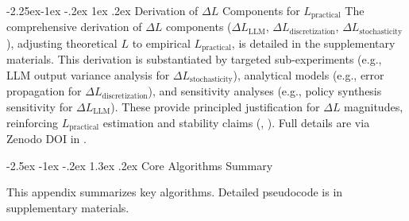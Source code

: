 \documentclass[manuscript,screen,9pt]{acmart}
\makeatletter
\renewcommand\section{\@startsection{section}{1}{\z@}%
  {-2.5ex \@plus -1ex \@minus -.2ex}%
  {1.3ex \@plus.2ex}%
  {\normalfont\Large\bfseries}}
\renewcommand\subsection{\@startsection{subsection}{2}{\z@}%
  {-2.25ex\@plus -1ex \@minus -.2ex}%
  {1ex \@plus .2ex}%
  {\normalfont\large\bfseries}}
\makeatother
\begin{document}
\subsection{Derivation of \texorpdfstring{$\Delta L$}{Delta L} Components for \texorpdfstring{$L_{\text{practical}}$}{L\_practical}}
\label{app:delta_L_derivation}
The comprehensive derivation of $\Delta L$ components ($\Delta L_{\text{LLM}}$, $\Delta L_{\text{discretization}}$, $\Delta L_{\text{stochasticity}}$), adjusting theoretical $L$ to empirical $L_{\text{practical}}$, is detailed in the supplementary materials. This derivation is substantiated by targeted sub-experiments (e.g., LLM output variance analysis for $\Delta L_{\text{stochasticity}}$), analytical models (e.g., error propagation for $\Delta L_{\text{discretization}}$), and sensitivity analyses (e.g., policy synthesis sensitivity for $\Delta L_{\text{LLM}}$). These provide principled justification for $\Delta L$ magnitudes, reinforcing $L_{\text{practical}}$ estimation and stability claims (, ). Full details are via Zenodo DOI in .

\section{Core Algorithms Summary}
\label{app:algorithms}

This appendix summarizes key algorithms. Detailed pseudocode is in supplementary materials.
\end{document}
